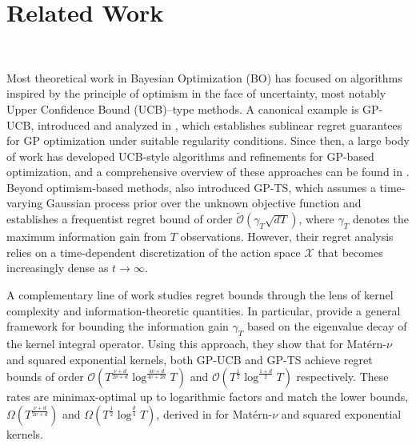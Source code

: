 \documentclass[final,12pt]{colt2026} %
\begin{document}
\section{Related Work}~\label{sec:litrev}

Most theoretical work in Bayesian Optimization (BO) has focused on algorithms inspired by the principle of optimism in the face of uncertainty, most notably Upper Confidence Bound (UCB)–type methods. A canonical example is GP-UCB, introduced and analyzed in \citet{srinivas2010gaussian}, which establishes sublinear regret guarantees for GP optimization under suitable regularity conditions. Since then, a large body of work has developed UCB-style algorithms and refinements for GP-based optimization, and a comprehensive overview of these approaches can be found in \citet{Ray&Gopalan2017}. Beyond optimism-based methods, \citet{Ray&Gopalan2017} also introduced GP-TS, which assumes a time-varying Gaussian process prior over the unknown objective function and establishes a frequentist regret bound of order $\tilde{\mathcal O}(\gamma_T \sqrt{dT})$, where $\gamma_T$ denotes the maximum information gain from $T$ observations. However, their regret analysis relies on a time-dependent discretization of the action space $\mathcal X$ that becomes increasingly dense as $t \to \infty$. 

A complementary line of work studies regret bounds through the lens of kernel complexity and information-theoretic quantities. In particular, \citet{vakili21a} provide a general framework for bounding the information gain $\gamma_T$ based on the eigenvalue decay of the kernel integral operator. Using this approach, they show that for Mat\'ern-$\nu$ and squared exponential kernels, both GP-UCB and GP-TS achieve regret bounds of order
$
\mathcal O(T^{\frac{\nu+d}{2\nu+d}}\log^{\frac{4\nu+d}{4\nu+2d}}T)$ and $
\mathcal O(T^{\frac{1}{2}}\log^{\frac{1+d}{2}}T)
$
respectively. These rates are minimax-optimal up to logarithmic factors and match the lower bounds, $\Omega(T^{\frac{\nu+d}{2\nu+d}})$ and $\Omega(T^{\frac{1}{2}}\log^{\frac{d}{4}}T)$, derived in \citet{scarlett17a} for Mat\'ern-$\nu$ and squared exponential kernels.
\end{document}
